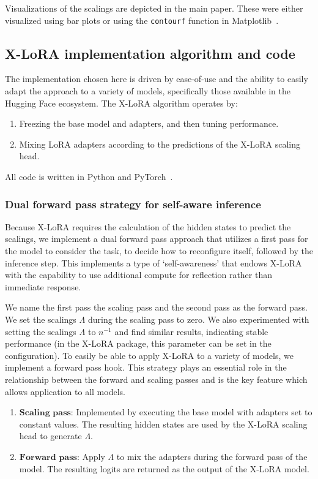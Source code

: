 Visualizations of the scalings are depicted in the main paper. These were either visualized using bar plots or using the \texttt{contourf} function in Matplotlib~\cite{MatplotlibDocumentation}. 

\subsection{X-LoRA implementation algorithm and code}
The implementation chosen here is driven by ease-of-use and the ability to easily adapt the approach to a variety of models, specifically those available in the Hugging Face ecosystem.
The X-LoRA algorithm operates by:
\begin{enumerate}
    \item Freezing the base model and adapters, and then tuning performance.
    \item Mixing LoRA adapters according to the predictions of the X-LoRA scaling head.
\end{enumerate}



All code is written in Python and PyTorch~\cite{Paszke2019PyTorchLibrary}. 


\subsubsection{Dual forward pass strategy for self-aware inference}
Because X-LoRA requires the calculation of the hidden states to predict the scalings, we implement a dual forward pass approach that utilizes a first pass for the model to consider the task, to decide how to reconfigure itself, followed by the inference step. This implements a type of `self-awareness' that endows X-LoRA with the capability to use additional compute for reflection rather than immediate response. 

We name the first pass the scaling pass and the second pass as the forward pass. We set the scalings $\Lambda$ during the scaling pass to zero. We  also experimented with setting the scalings $\Lambda$ to ${n}^{-1}$ and find similar results, indicating stable performance (in the X-LoRA package, this parameter can be set in the configuration). To easily be able to apply X-LoRA to a variety of models, we implement a forward pass hook. This strategy plays an essential role in the relationship between the forward and scaling passes and is the key feature which allows application to all models. 

\begin{enumerate}
    \item $\mathbf{Scaling}$ $\mathbf{pass}$: Implemented by executing the base model with adapters set to constant values. The resulting hidden states are used by the X-LoRA scaling head to generate $\Lambda$.
    \item $\mathbf{Forward}$ $\mathbf{pass}$: Apply $\Lambda$ to mix the adapters during the forward pass of the model. The resulting logits are returned as the output of the X-LoRA model.
\end{enumerate}

